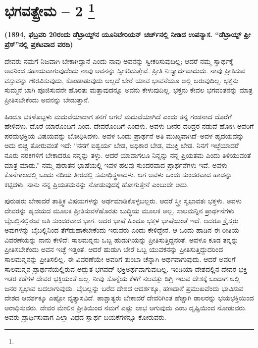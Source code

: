 
\chapter[ಭಗವತ್ಪ್ರೇಮ –೨ ]{ಭಗವತ್ಪ್ರೇಮ – 2 \protect\footnote{}}

\begin{center}
\textbf{(1894, ಫೆಬ್ರವರಿ 20ರಂದು ಡೆಟ್ರಾಯ್ಟ್​ನ ಯೂನಿಟೇರಿಯನ್​ ಚರ್ಚ್​ನಲ್ಲಿ ನೀಡಿದ ಉಪನ್ಯಾಸ. “ಡೆಟ್ರಾಯ್ಟ್​ ಫ್ರೀ ಪ್ರೆಸ್​”ನಲ್ಲಿ ಪ್ರಕಟವಾದ ವರದಿ)}
\end{center}

ದೇವರು ನಮಗೆ ನಿಜವಾಗಿ ಬೇಕಾಗಿದ್ದಾನೆ ಎಂದು ನಾವು ಅವನನ್ನು ಸ್ವೀಕರಿಸುವುದಿಲ್ಲ; ಆದರೆ ನಮ್ಮ ಸ್ವಾರ್ಥಕ್ಕೆ ಅವನಿಂದ ಸಹಾಯವಾಗುವುದೆಂದು ನಾವು ಅವನನ್ನು ಸ್ವೀಕರಿಸುತ್ತೇವೆ. ಪ್ರೀತಿ ನಿಃಸ್ವಾರ್ಥವಾದುದು. ನಾವು ಪ್ರೀತಿಸುವ ವಸ್ತುವನ್ನು ಗೌರವಿಸುವುದು, ಕೊಂಡಾಡುವುದು ಅಲ್ಲದೆ ಬೇರೆ ಯಾವ ಭಾವನೆಯೂ ಅಲ್ಲಿ ಬರುವುದಿಲ್ಲ. ಭಕ್ತನು ಸುಮ್ಮನೆ ಬಾಗಿ ಪೂಜಿಸುವನೇ ಹೊರತು ಮತ್ತಾವುದನ್ನೂ ಅವನು ಕೇಳುವುದಿಲ್ಲ. ಭಕ್ತನು ಕೇವಲ ಭಗವಂತನನ್ನು ಮಾತ್ರ ಪ್ರೀತಿಸಬೇಕೆಂದು ಅವನನ್ನು ಬೇಡುತ್ತಾನೆ.

ಹಿಂದೂ ಭಕ್ತಳೊಬ್ಬಳು ಮದುವೆಯಾದಾಗ ತನಗೆ ಆಗಲೆ ಮದುವೆಯಾಗಿದೆ ಎಂದು ತನ್ನ ಗಂಡನಾದ ದೊರೆಗೆ ಹೇಳಿದಳು. ದೊರೆ ಯಾರೊಂದಿಗೆ ಎಂದ. ದೇವರೊಂದಿಗೆ ಎಂದಳು. ಅವಳು ದೀನರ ದರಿದ್ರರ ನಡುವೆ ಹೋಗಿ ಅವರಿಗೆ ಪರಮಭಕ್ತಿಯ ವಿಷಯವನ್ನು ಬೋಧಿಸಿದಳು. ಅವಳ ಒಂದು ಪ್ರಾರ್ಥನೆ ಅತಿ ಮುಖ್ಯವಾಗಿದೆ–ಅವಳ ಹೃದಯವನ್ನು ಅದು ಬಿಚ್ಚಿ ತೋರುವಂತೆ ಇದೆ: “ನನಗೆ ಐಶ್ವರ್ಯ ಬೇಡ, ಅಧಿಕಾರ ಬೇಡ, ಮುಕ್ತಿ ಬೇಡ. ನಿನಗೆ ಇಚ್ಛೆಯಾದರೆ ನೂರು ನರಕಗಳಿಗೆ ಬೇಕಾದರೂ ನನ್ನನ್ನು ತಳ್ಳು. ಆದರೆ ಯಾವಾಗಲೂ ನಿನ್ನನ್ನು ನನ್ನ ಪ್ರಿಯತಮ ಎಂದು ತಿಳಿಯುವಂತೆ ಮಾತ್ರ ಮಾಡು.” ನಮ್ಮ ಪುರಾತನ ಭಾಷೆಯಲ್ಲಿ ಇವಳ ಹಲವು ಸುಂದರವಾದ ಪ್ರಾರ್ಥನೆಗಳು ಇವೆ. ಅವಳು ಕೊನೆಗಾಲದಲ್ಲಿ ಒಂದು ನದಿಯ ತೀರದಲ್ಲಿ ಸಮಾಧಿಸ್ಥಳಾದಳು. ಆಗ ಅವಳು ಒಂದು ಸುಂದರವಾದ ಹಾಡನ್ನು ಕಟ್ಟಿದಳು. ನಾನು ನನ್ನ ಪ್ರಿಯತಮನನ್ನು ನೋಡುವುದಕ್ಕೆ ಹೋಗುತ್ತೇನೆ ಎಂಬುದೇ ಅದು.

ಪುರುಷರು ಬೇಕಾದರೆ ತಾತ್ತ್ವಿಕ ವಿಷಯಗಳನ್ನು ಅರ್ಥಮಾಡಿಕೊಳ್ಳಬಲ್ಲರು. ಆದರೆ ಸ್ತ್ರೀ ಸ್ವಭಾವತಃ ಭಕ್ತಳು. ಅವಳು ದೇವರನ್ನು ಹೃದಯದ ಮೂಲಕ ಪ್ರೀತಿಸುವಳೆ\break ಹೊರತು ಬುದ್ಧಿಯ ಮೂಲಕ ಅಲ್ಲ. ಸಾಲಮನ್ನಿನ ಪ್ರಾರ್ಥನೆಗಳು ಬೈಬಲ್ಲಿನಲ್ಲಿರುವ ಅತಿ ಸುಂದರವಾದ ಭಾಗ. ಅದರ ಭಾಷೆ ಹಿಂದೂ ಭಕ್ತಳ ಭಾಷೆಯಂತೆ ಇದೆ. ಆದರೂ ಕ್ರೈಸ್ತರು ಅವುಗಳನ್ನು ಬೈಬಲ್ಲಿನಿಂದ ತೆಗೆದುಹಾಕಬೇಕೆಂದು ಇರುವರು ಎಂದು ಕೇಳಿದ್ದೇನೆ. ಆ ಒಂದು ಹಾಡಿನ ಈ ರೀತಿಯ ವಿವರಣೆಯನ್ನು ನಾನು ಕೇಳಿದೆ: ಸಾಲಮನ್ನನು ಒಬ್ಬ ಹುಡುಗಿಯನ್ನು ಪ್ರೀತಿಸುತ್ತಿದ್ದನಂತೆ. ಅವಳೂ ಕೂಡ ತನ್ನನ್ನು ಪ್ರೀತಿಸಬೇಕೆಂದು ಅವನ ಇಚ್ಛೆ ಇತ್ತಂತೆ. ಆದರೆ ಹುಡುಗಿ ಬೇರೆ ಒಬ್ಬ ಯುವಕನನ್ನು ಪ್ರೀತಿಸುತ್ತಿದ್ದುದರಿಂದ ಸಾಲಮನ್ನನನ್ನು ಪ್ರೀತಿಸಲಿಲ್ಲ. ಈ ವಿವರಣೆಯೇ ಅವರಿಗೆ ತುಂಬಾ ಚೆನ್ನಾಗಿ ಅರ್ಥವಾಗುವುದು. ಆದರೆ ಅವರಿಗೆ ಸಾಲಮನ್ನನ ಪ್ರಾರ್ಥನೆಯಲ್ಲಿರುವ ಅದ್ಭುತ ಭಗವದ್​ ಭಕ್ತಿ\break ಅರ್ಥವಾಗುವುದಿಲ್ಲ. ಇಂಡಿಯಾ ದೇಶದಲ್ಲಿನ ದೇವರ ಭಕ್ತಿ ಇತರ ಕಡೆಗಳ ದೇವರ ಭಕ್ತಿಯಂತೆ ಅಲ್ಲ. ನೀವು ಸೊನ್ನೆಯ ಕೆಳಗೆ ನಲವತ್ತು ಡಿಗ್ರಿ ಇರುವ ದೇಶಕ್ಕೆ ಬಂದಾಗ ಅಲ್ಲಿ ಜನರ ಸ್ವಭಾವ ಬದಲಾಗುವುದು. ಬೈಬಲ್ಲನ್ನು ಬರೆದ ದೇಶದ ಆದರ್ಶಕ್ಕೂ, ಹಣದಾಸೆ ಪ್ರಮುಖವೆಂದು ಭಾವಿಸುವ ದೇಶದ ಆದರ್ಶಕ್ಕೂ ಎಷ್ಟೋ ವ್ಯತ್ಯಾಸವಿದೆ. ಪಾಶ್ಚಾತ್ಯರು ಬೇಕಾದರೆ ದೇವರಿಗಿಂತ ಹೆಚ್ಚಾಗಿ ಡಾಲರನ್ನು ಭಯಭಕ್ತಿಯಿಂದ ಆರಾಧಿಸುವರು. ದೇವರ ಮೇಲಿನ ಪ್ರೀತಿಯಿಂದ ನಮಗೆ ಎಷ್ಟು ಲಾಭ ಆಗುವುದು ಎಂಬ ದೃಷ್ಟಿಯಿಂದ ನೋಡುವರು. ಅವರು ಪ್ರಾರ್ಥಿಸುವಾಗ ಎಲ್ಲಾ ವಿಧದ ಸ್ವಾರ್ಥ ಬಯಕೆಗಳನ್ನೂ ಕೋರುವರು.

